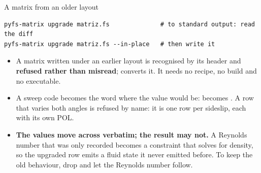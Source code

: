 \begin{frame}[fragile]{A matrix from an older layout}
\begin{lstlisting}[style=ftsbase]
pyfs-matrix upgrade matriz.fs              # to standard output: read the diff
pyfs-matrix upgrade matriz.fs --in-place   # then write it
\end{lstlisting}
\begin{itemize}\small
  \item A matrix written under an earlier layout is recognised by its header
        and \textbf{refused rather than misread};  converts it.
        It needs no recipe, no build and no executable.
  \item A sweep code becomes the word  where the value would be:
         becomes . A row that varies both angles is
        refused by name: it is one row per sideslip, each with its own POL.
  \item \textbf{The values move across verbatim; the result may not.} A
        Reynolds number that was only recorded becomes a constraint that
        solves for density, so the upgraded row emits a fluid state it never
        emitted before. To keep the old behaviour, drop  and let the
        Reynolds number follow.
\end{itemize}
\end{frame}

